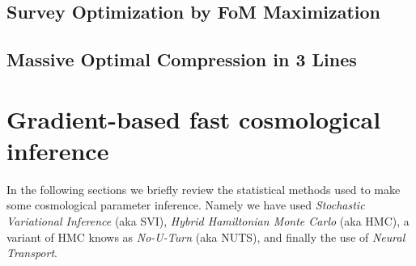 \documentclass[final,5p,times,twocolumn,authoryear]{elsarticle}
\begin{document}


\subsection{Survey Optimization by FoM Maximization}
\label{sec-FOM-optimisation}

\subsection{Massive Optimal Compression in 3 Lines}


\section{Gradient-based fast cosmological inference}
%
In the following sections we briefly review the statistical methods used to make some cosmological parameter inference. Namely we have used \textit{Stochastic Variational Inference} (aka SVI), \textit{Hybrid Hamiltonian Monte Carlo} (aka HMC), a variant of HMC knows as \textit{No-U-Turn} (aka NUTS), and finally the use of  \textit{Neural Transport}.   
%
\end{document}
